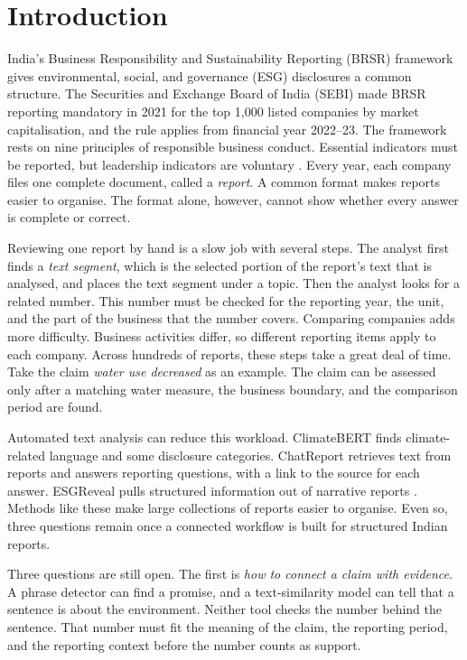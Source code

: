 \section{Introduction}
\label{sec:introduction}

 India's Business Responsibility and Sustainability Reporting (BRSR) framework gives environmental, social, and governance (ESG) disclosures a common structure. The Securities and Exchange Board of India (SEBI) made BRSR reporting mandatory in 2021 for the top 1,000 listed companies by market capitalisation, and the rule applies from financial year 2022--23. The framework rests on nine principles of responsible business conduct. Essential indicators must be reported, but leadership indicators are voluntary \cite{sebi2021}. Every year, each company files one complete document, called a \emph{report}. A common format makes reports easier to organise. The format alone, however, cannot show whether every answer is complete or correct.

Reviewing one report by hand is a slow job with several steps. The analyst first finds a \emph{text segment}, which is the selected portion of the report's text that is analysed, and places the text segment under a topic. Then the analyst looks for a related number. This number must be checked for the reporting year, the unit, and the part of the business that the number covers. Comparing companies adds more difficulty. Business activities differ, so different reporting items apply to each company. Across hundreds of reports, these steps take a great deal of time. Take the claim \emph{water use decreased} as an example. The claim can be assessed only after a matching water measure, the business boundary, and the comparison period are found.

Automated text analysis can reduce this workload. ClimateBERT finds climate-related language and some disclosure categories. ChatReport retrieves text from reports and answers reporting questions, with a link to the source for each answer. ESGReveal pulls structured information out of narrative reports \cite{webersinke2021,ni2023,zou2025}. Methods like these make large collections of reports easier to organise. Even so, three questions remain once a connected workflow is built for structured Indian reports.

Three questions are still open. The first is \emph{how to connect a claim with evidence}. A phrase detector can find a promise, and a text-similarity model can tell that a sentence is about the environment. Neither tool checks the number behind the sentence. That number must fit the meaning of the claim, the reporting period, and the reporting context before the number counts as support.

